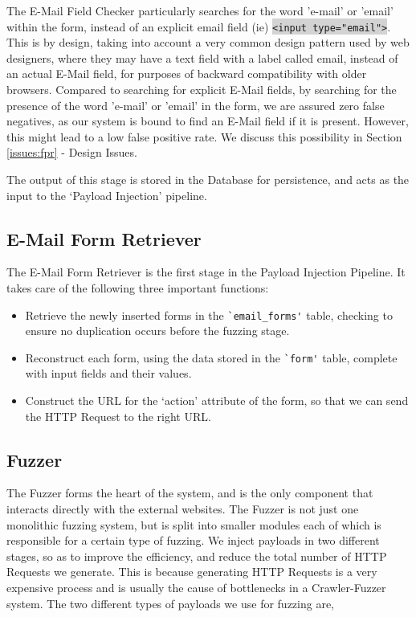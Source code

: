 	The E-Mail Field Checker particularly searches for the word 'e-mail' or 'email' within the form, instead of an explicit email field (ie) \colorbox{lightgray}{\lstinline{<input type="email">}}. This is by design, taking into account a very common design pattern used by web designers, where they may have a text field with a label called email, instead of an actual E-Mail field, for purposes of backward compatibility with older browsers. Compared to searching for explicit E-Mail fields, by searching for the presence of the word 'e-mail' or 'email' in the form, we are assured zero false negatives, as our system is bound to find an E-Mail field if it is present. However, this might lead to a low false positive rate. We discuss this possibility in Section \ref*{issues:fpr} - Design Issues. 
	
	The output of this stage is stored in the Database for persistence, and acts as the input to the `Payload Injection' pipeline.
	

\subsection{E-Mail Form Retriever}
	\label{Comp:EMFR}
	The E-Mail Form Retriever is the first stage in the Payload Injection Pipeline. It takes care of the following three important functions:
	\begin{itemize}
		\item Retrieve the newly inserted forms in the \lstinline{`email_forms'} table, checking to ensure no duplication occurs before the fuzzing stage.
		\item Reconstruct each form, using the data stored in the \lstinline{`form'} table, complete with input fields and their values.
		\item Construct the URL for the `action' attribute of the form, so that we can send the HTTP Request to the right URL. 
	\end{itemize}
		
\subsection{Fuzzer}
	\label{Comp:Fuzzer}
	The Fuzzer forms the heart of the system, and is the only component that interacts directly with the external websites. The Fuzzer is not just one monolithic fuzzing system, but is split into smaller modules each of which is responsible for a certain type of fuzzing.  We inject payloads in two different stages, so as to improve the efficiency, and reduce the total number of HTTP Requests we generate. This is because generating HTTP Requests is a very expensive process and is usually the cause of bottlenecks in a Crawler-Fuzzer system.
	The two different types of payloads we use for fuzzing are,
